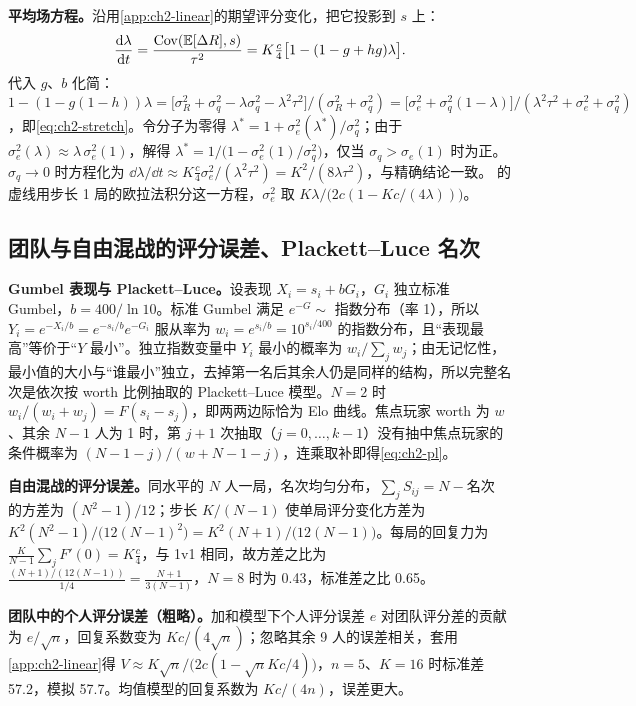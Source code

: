 \textbf{平均场方程。}沿用\cref{app:ch2-linear}的期望评分变化，把它投影到 $s$ 上：
\[
  \frac{\mathrm{d}\lambda}{\mathrm{d} t}=\frac{\operatorname{Cov}(\mathbb{E}[\Delta R],s)}{\tau^2}=K\tfrac c4\bigl[1-(1-g+hg)\lambda\bigr].
\]
代入 $g$、$b$ 化简：$1-(1-g(1-h))\lambda=\bigl[\sigma_R^2+\sigma_q^2-\lambda\sigma_q^2-\lambda^2\tau^2\bigr]/(\sigma_R^2+\sigma_q^2)=\bigl[\sigma_e^2+\sigma_q^2(1-\lambda)\bigr]/(\lambda^2\tau^2+\sigma_e^2+\sigma_q^2)$，即\cref{eq:ch2-stretch}。令分子为零得 $\lambda^*=1+\sigma_e^2(\lambda^*)/\sigma_q^2$；由于 $\sigma_e^2(\lambda)\approx\lambda\,\sigma_e^2(1)$，解得 $\lambda^*=1/\bigl(1-\sigma_e^2(1)/\sigma_q^2\bigr)$，仅当 $\sigma_q>\sigma_e(1)$ 时为正。$\sigma_q\to0$ 时方程化为 $\dd\lambda/\dd t\approx K\tfrac c4\sigma_e^2/(\lambda^2\tau^2)=K^2/(8\lambda\tau^2)$，与精确结论一致。 的虚线用步长 1 局的欧拉法积分这一方程，$\sigma_e^2$ 取 $K\lambda/\bigl(2c(1-Kc/(4\lambda))\bigr)$。

\subsection{团队与自由混战的评分误差、Plackett–Luce 名次}
\label{app:ch2-team}

\textbf{Gumbel 表现与 Plackett–Luce。}设表现 $X_i=s_i+bG_i$，$G_i$ 独立标准 Gumbel，$b=400/\ln10$。标准 Gumbel 满足 $e^{-G}\sim$ 指数分布（率 1），所以 $Y_i=e^{-X_i/b}=e^{-s_i/b}e^{-G_i}$ 服从率为 $w_i=e^{s_i/b}=10^{s_i/400}$ 的指数分布，且“表现最高”等价于“$Y$ 最小”。独立指数变量中 $Y_i$ 最小的概率为 $w_i/\sum_jw_j$；由无记忆性，最小值的大小与“谁最小”独立，去掉第一名后其余人仍是同样的结构，所以完整名次是依次按 worth 比例抽取的 Plackett–Luce 模型。$N=2$ 时 $w_i/(w_i+w_j)=F(s_i-s_j)$，即两两边际恰为 Elo 曲线。焦点玩家 worth 为 $w$、其余 $N-1$ 人为 1 时，第 $j+1$ 次抽取（$j=0,\dots,k-1$）没有抽中焦点玩家的条件概率为 $(N-1-j)/(w+N-1-j)$，连乘取补即得\cref{eq:ch2-pl}。

\textbf{自由混战的评分误差。}同水平的 $N$ 人一局，名次均匀分布，$\sum_jS_{ij}=N-\text{名次}$ 的方差为 $(N^2-1)/12$；步长 $K/(N-1)$ 使单局评分变化方差为 $K^2(N^2-1)/\bigl(12(N-1)^2\bigr)=K^2(N+1)/\bigl(12(N-1)\bigr)$。每局的回复力为 $\frac{K}{N-1}\sum_jF'(0)=K\tfrac c4$，与 1v1 相同，故方差之比为 $\frac{(N+1)/(12(N-1))}{1/4}=\frac{N+1}{3(N-1)}$，$N=8$ 时为 0.43，标准差之比 0.65。

\textbf{团队中的个人评分误差（粗略）。}加和模型下个人评分误差 $e$ 对团队评分差的贡献为 $e/\sqrt n$，回复系数变为 $Kc/(4\sqrt n)$；忽略其余 9 人的误差相关，套用\cref{app:ch2-linear}得 $V\approx K\sqrt n/\bigl(2c(1-\sqrt nKc/4)\bigr)$，$n=5$、$K=16$ 时标准差 57.2，模拟 57.7。均值模型的回复系数为 $Kc/(4n)$，误差更大。

